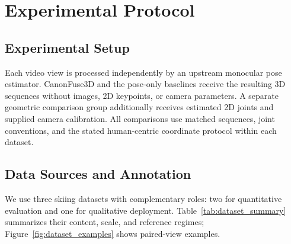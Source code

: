 \documentclass[preprint,12pt]{elsarticle}
\providecommand{\DIFaddbegin}{} %
\providecommand{\DIFaddend}{} %
\providecommand{\DIFadd}[1]{{\protect\color{blue}#1}} %
\begin{document}
\section{Experimental Protocol}

\subsection{Experimental Setup}

Each video view is processed independently by an upstream monocular pose estimator. CanonFuse3D and the pose-only baselines receive the resulting 3D sequences without images, 2D keypoints, or camera parameters. A separate geometric comparison group additionally receives estimated 2D joints and supplied camera calibration. All comparisons use matched sequences, joint conventions, and the stated human-centric coordinate protocol within each dataset.

\subsection{Data Sources and Annotation}
\label{subsec:dataset_annotation}

We use three skiing datasets with complementary roles: two for quantitative evaluation and one for qualitative deployment. Table~\ref{tab:dataset_summary} summarizes their  \DIFaddbegin \DIFadd{content, scale, }\DIFaddend and reference regimes; Figure~\ref{fig:dataset_examples} shows paired-view examples.
\end{document}
